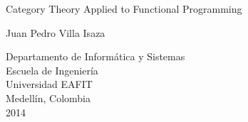 \begin{titlepage}

  \begin{center}

    {\LARGE Category Theory Applied to Functional Programming}

    \vspace*{\fill}

    {\large Juan Pedro Villa Isaza}

    \vspace*{\fill}

    {\large Departamento de Informática y Sistemas}\\
    {\large Escuela de Ingeniería}\\
    {\large Universidad EAFIT}\\
    {\large Medellín, Colombia}\\
    {\large 2014}

  \end{center}

\end{titlepage}
